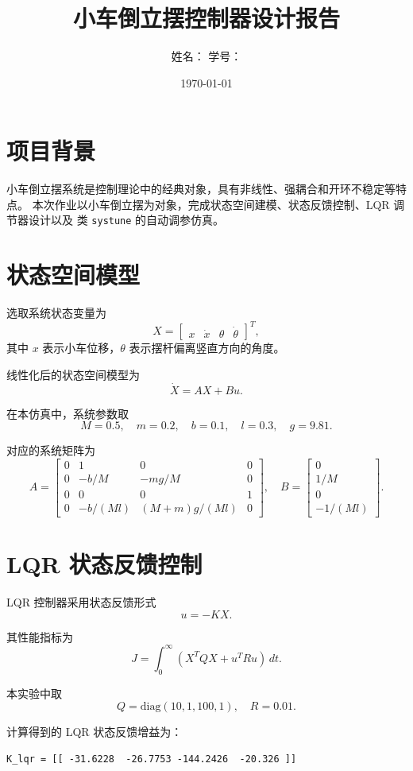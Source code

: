 \documentclass[UTF8,12pt,a4paper]{ctexart}
\title{小车倒立摆控制器设计报告}
\author{姓名：\underline{\hspace{3cm}} \quad 学号：\underline{\hspace{3cm}}}
\date{\today}
\begin{document}
\maketitle

\section{项目背景}

小车倒立摆系统是控制理论中的经典对象，具有非线性、强耦合和开环不稳定等特点。
本次作业以小车倒立摆为对象，完成状态空间建模、状态反馈控制、LQR 调节器设计以及
类 \texttt{systune} 的自动调参仿真。

\section{状态空间模型}

选取系统状态变量为
\[
X=
\begin{bmatrix}
x & \dot{x} & \theta & \dot{\theta}
\end{bmatrix}^T,
\]
其中 $x$ 表示小车位移，$\theta$ 表示摆杆偏离竖直方向的角度。

线性化后的状态空间模型为
\[
\dot{X} = AX + Bu.
\]

在本仿真中，系统参数取
\[
M=0.5,\quad m=0.2,\quad b=0.1,\quad l=0.3,\quad g=9.81.
\]

对应的系统矩阵为
\[
A=
\begin{bmatrix}
0 & 1 & 0 & 0\\
0 & -b/M & -mg/M & 0\\
0 & 0 & 0 & 1\\
0 & -b/(Ml) & (M+m)g/(Ml) & 0
\end{bmatrix},
\quad
B=
\begin{bmatrix}
0\\
1/M\\
0\\
-1/(Ml)
\end{bmatrix}.
\]

\section{LQR 状态反馈控制}

LQR 控制器采用状态反馈形式
\[
u=-KX.
\]

其性能指标为
\[
J=\int_0^\infty \left(X^TQX+u^TRu\right)\,dt.
\]

本实验中取
\[
Q=\mathrm{diag}(10,1,100,1),\quad R=0.01.
\]

计算得到的 LQR 状态反馈增益为：
\begin{verbatim}
K_lqr = [[ -31.6228  -26.7753 -144.2426  -20.326 ]]
\end{verbatim}
\end{document}
